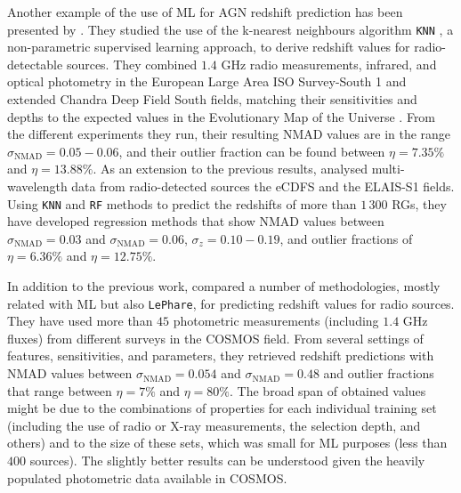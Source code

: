 \documentclass{aa}
\begin{document}
Another example of the use of ML for AGN redshift prediction has been presented by \citet{2019PASP..131j8003L}. They studied the use of the k-nearest neighbours algorithm \verb|KNN| \citep{1053964}, a non-parametric supervised learning approach, to derive redshift values for radio-detectable sources. They combined $1.4$ GHz radio measurements, infrared, and optical photometry in the European Large Area ISO Survey-South 1 \citep[ELAIS-S1;][]{2000MNRAS.316..749O} and extended Chandra Deep Field South \citep[eCDFS;][]{2005ApJS..161...21L} fields, matching their sensitivities and depths to the expected values in the Evolutionary Map of the Universe \citep[EMU;][]{2011PASA...28..215N}. From the different experiments they run, their resulting NMAD values are in the range ${\sigma_{\mathrm{NMAD}} = 0.05 - 0.06}$, and their outlier fraction can be found between ${\eta = 7.35 \%}$ and ${\eta = 13.88 \%}$. 
As an extension to the previous results, \citet{LUKEN2022100557} analysed multi-wavelength data from radio-detected sources the eCDFS and the ELAIS-S1 fields. Using \texttt{KNN} and \texttt{RF} methods to predict the redshifts of more than $1\,300$ RGs, they have developed regression methods that show NMAD values between ${\sigma_{\mathrm{NMAD}} = 0.03}$ and ${\sigma_{\mathrm{NMAD}} = 0.06}$, ${\sigma_{z} = 0.10 - 0.19}$, and outlier fractions of ${\eta = 6.36 \%}$ and ${\eta = 12.75 \%}$.

In addition to the previous work, \citet{2019PASP..131j8004N} compared a number of methodologies, mostly related with ML but also \texttt{LePhare}, for predicting redshift values for radio sources. They have used more than $45$ photometric measurements (including $1.4$ GHz fluxes) from different surveys in the COSMOS field. From several settings of features, sensitivities, and parameters, they retrieved redshift predictions with NMAD values between ${\sigma_{\mathrm{NMAD}} = 0.054}$ and ${\sigma_{\mathrm{NMAD}} = 0.48}$ and outlier fractions that range between ${\eta = 7 \%}$ and ${\eta = 80 \%}$. The broad span of obtained values might be due to the combinations of properties for each individual training set (including the use of radio or X-ray measurements, the selection depth, and others) and to the size of these sets, which was small for ML purposes (less than $400$ sources). The slightly better results can be understood given the heavily populated photometric data available in COSMOS.
\end{document}
